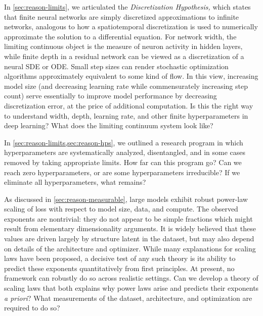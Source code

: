 \begin{opendirection}
\label{openquestion:discretization}

In \cref{sec:reason-limits}, we articulated the \textit{Discretization Hypothesis,} which states that finite neural networks are simply discretized approximations to infinite networks, analogous to how a spatiotemporal discretization is used to numerically approximate the solution to a differential equation. For network width, the limiting continuous object is the measure of neuron activity in hidden layers, while finite depth in a residual network can be viewed as a discretization of a neural SDE or ODE.
Small step sizes can render stochastic optimization algorithms approximately equivalent to some kind of flow. In this view, increasing model size (and decreasing learning rate while commensurately increasing step count) serve essentially to improve model performance by decreasing discretization error, at the price of additional computation.
Is this the right way to understand width, depth, learning rate, and other finite hyperparameters in deep learning?
What does the limiting continuum system look like?

\end{opendirection}



\begin{opendirection}
\label{openquestion:zero_hyperparameters}

In \cref{sec:reason-limits,sec:reason-hps}, we outlined a research program in which hyperparameters are systematically analyzed, disentangled, and in some cases removed by taking appropriate limits.
How far can this program go?
Can we reach zero hyperparameters, or are some hyperparameters irreducible?
If we eliminate all hyperparameters, what remains?%
\end{opendirection}

\begin{opendirection}
\label{openquestion:predict_powerlaw_exponents}

As discussed in \cref{sec:reason-measurable}, large models exhibit robust power-law scaling of loss with respect to model size, data, and compute.
The observed exponents are nontrivial: they do not appear to be simple fractions which might result from elementary dimensionality arguments.
It is widely believed that these values are driven largely by structure latent in the dataset, but may also depend on details of the architecture and optimizer.
While many explanations for scaling laws have been proposed, a decisive test of any such theory is its ability to predict these exponents quantitatively from first principles.
At present, no framework can robustly do so across realistic settings.
Can we develop a theory of scaling laws that both explains why power laws arise and predicts their exponents \textit{a priori}?
What measurements of the dataset, architecture, and optimization are required to do so?
\end{opendirection}

